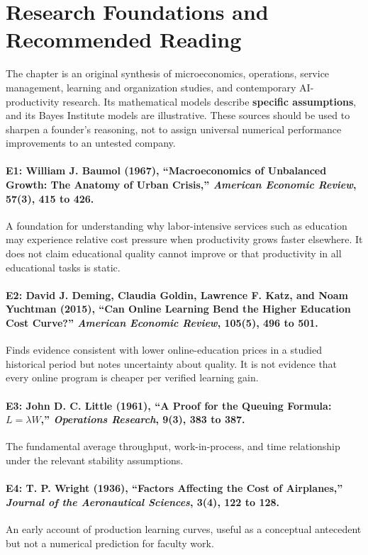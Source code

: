 \section*{Research Foundations and Recommended Reading}

The chapter is an original synthesis of microeconomics, operations, service management, learning and organization studies, and contemporary AI-productivity research. Its mathematical models describe \textbf{specific assumptions}, and its Bayes Institute models are illustrative. These sources should be used to sharpen a founder's reasoning, not to assign universal numerical performance improvements to an untested company.

\paragraph*{E1: William J. Baumol (1967), ``Macroeconomics of Unbalanced Growth: The Anatomy of Urban Crisis,'' \emph{American Economic Review}, 57(3), 415 to 426.} A foundation for understanding why labor-intensive services such as education may experience relative cost pressure when productivity grows faster elsewhere. It does not claim educational quality cannot improve or that productivity in all educational tasks is static.

\paragraph*{E2: David J. Deming, Claudia Goldin, Lawrence F. Katz, and Noam Yuchtman (2015), ``Can Online Learning Bend the Higher Education Cost Curve?'' \emph{American Economic Review}, 105(5), 496 to 501.} Finds evidence consistent with lower online-education prices in a studied historical period but notes uncertainty about quality. It is not evidence that every online program is cheaper per verified learning gain.

\paragraph*{E3: John D. C. Little (1961), ``A Proof for the Queuing Formula: $L = \lambda W$,'' \emph{Operations Research}, 9(3), 383 to 387.} The fundamental average throughput, work-in-process, and time relationship under the relevant stability assumptions.

\paragraph*{E4: T. P. Wright (1936), ``Factors Affecting the Cost of Airplanes,'' \emph{Journal of the Aeronautical Sciences}, 3(4), 122 to 128.} An early account of production learning curves, useful as a conceptual antecedent but not a numerical prediction for faculty work.

